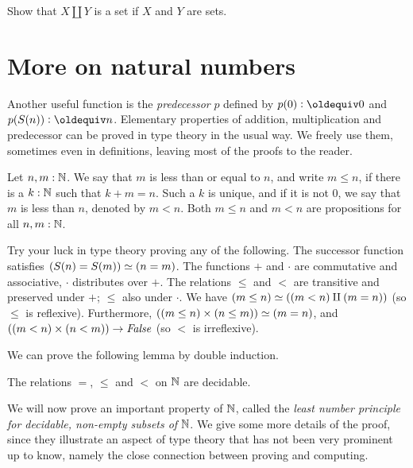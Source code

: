 \begin{xca}\label{xca:set-sum}
Show that $X\amalg Y$ is a set if $X$ and $Y$ are sets.
\end{xca}

\section{More on natural numbers}
\label{sec:more-on-N}

Another useful function is the \emph{predecessor} $p$ defined by
$p(0)\defeq 0$ and $p(S(n))\defeq n$.
Elementary properties of addition, multiplication and predecessor
can be proved in type theory in the usual way.
We freely use them, sometimes even in definitions, leaving most of the
proofs to the reader.

\begin{definition}
\label{def:orderonN}
Let $n,m:\mathbb{N}$. We say that $m$ is less than or equal to $n$, and write $m\leq n$,
if there is a $k:\mathbb{N}$ such that $k+m=n$. Such a $k$ is unique, and if it
is not $0$, we say that $m$ is less than $n$, denoted by $m<n$.
Both $m\leq n$ and $m<n$ are propositions for all $n,m:\mathbb{N}$.
\end{definition}

\begin{xca}\label{xca:try-your-luck-N}
Try your luck in type theory proving any of the following.
The successor function satisfies $(S(n)=S(m))\simeq(n=m)$.
The functions $+$ and $\cdot$ are commutative and associative,
$\cdot$ distributes over $+$.
The relations $\leq$ and $<$ are transitive and
preserved under $+$; $\leq$ also under $\cdot$. 
We have $(m\leq n) \simeq ((m<n)\amalg(m=n))$ (so $\leq$ is reflexive).
Furthermore, $((m\leq n)\times (n\leq m)) \simeq (m=n)$,
and $((m<n)\times(n<m))\to\mathop{\mathit{False}}$ (so $<$ is irreflexive).
\end{xca}

We can prove the following lemma by double induction.

\begin{lemma}\label{lem:dec-eq+order-N}
The relations $=$, $\leq$ and $<$ on $\mathbb{N}$ are decidable.
\end{lemma}

We will now prove an important property of $\mathbb{N}$, called the
\emph{least number principle for decidable, non-empty subsets of} $\mathbb{N}$.
We give some more details of the proof, since they illustrate an aspect
of type theory that has not been very prominent up to know, namely
the close connection between proving and computing.

